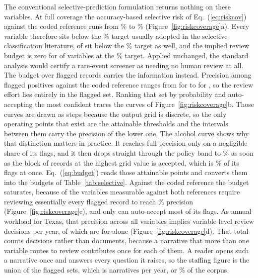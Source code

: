 The conventional selective-prediction formulation returns nothing on these variables. At
full coverage the accuracy-based selective risk of Eq.~(\ref{eq:riskcov}) against the coded
reference runs from \FullCovRiskMin\% to \FullCovRiskMax\% (Figure~\ref{fig:riskcoverage}a).
Every variable therefore sits below the \RiskTargetFive\% target usually adopted in the
selective-classification literature, \NzeroBudgetOne{} of \NvarsCoded{} sit below the
\RiskTargetOne\% target as well, and the implied review budget is zero for \NzeroBudget{} of
\NvarsCoded{} variables at the \RiskTargetFive\% target. Applied unchanged, the standard
analysis would certify a rare-event screener as needing no human review at all. The budget
over flagged records carries the information instead. Precision among flagged positives
against the coded reference ranges from \PrecMin{} for \PrecMinVar{} to \PrecMax{} for
\PrecMaxVar{}, so the review effort lies entirely in the flagged set. Ranking that set by
probability and auto-accepting the most confident traces the curves of
Figure~\ref{fig:riskcoverage}b. Those curves are drawn as steps because the output grid is
discrete, so the only operating points that exist are the attainable thresholds and the
intervals between them carry the precision of the lower one. The alcohol curve shows why that distinction
matters in practice. It reaches full precision only on a negligible share of its flags, and it
then drops
straight through the policy band to \PrecAlcoholTopBlock\% as soon as the block of records at
the highest grid value is accepted, which is \PrecAlcoholTopCoverage\% of its flags at once.
Eq.~(\ref{eq:budget}) reads those attainable points and converts them into the budgets of
Table~\ref{tab:selective}. Against the coded reference the budget
saturates, because \BudgetCodedSatN{} of the \BudgetCompN{} variables measurable against both
references require reviewing essentially every flagged record to reach \PrecTargetNinety\%
precision (Figure~\ref{fig:riskcoverage}c), and only \PrecMaxVar{} can auto-accept most of its
flags. As annual workload for Texas, that precision across all \NvarsCoded{} variables implies
\ReviewDecisionsPerYear{} variable-level review decisions per year, of which
\ReviewPerYearMax{} are for \ReviewPerYearMaxVar{} alone (Figure~\ref{fig:riskcoverage}d).
That total counts decisions rather than documents, because a narrative that more than one
variable routes to review contributes once for each of them. A reader opens such a narrative
once and answers every question it raises, so the staffing figure is the union of the flagged
sets, which is \ReviewNarrativesPerYear{} narratives per year, or \ReviewNarrativeShare\% of
the corpus.

